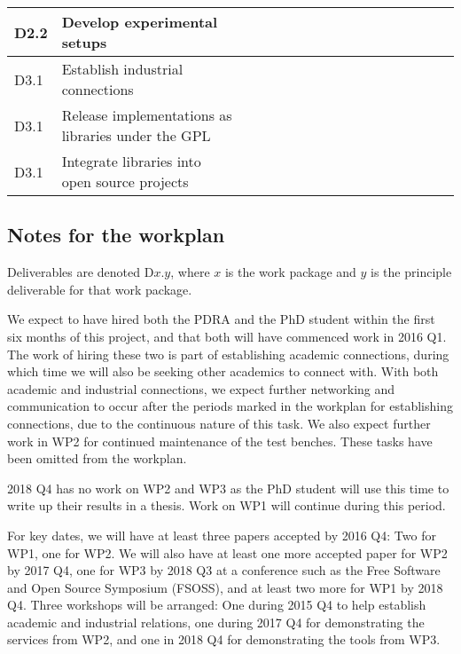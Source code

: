 \documentclass[a4paper,11pt]{article}
\begin{document}
\begin{landscape}
\begin{tabularx}{\linewidth}{|lX|c|c|c|c|c|c|c|c|c|c|c|c|c|c|c|}
        D2.2 & Develop experimental setups & & & & & \cellcolor[gray]{0.5} & \cellcolor[gray]{0.5} & \cellcolor[gray]{0.5} & \cellcolor[gray]{0.5} & \cellcolor[gray]{0.5} & \cellcolor[gray]{0.5} & & & & \\\hline
        D3.1 & Establish industrial connections & \cellcolor[gray]{0.5} & \cellcolor[gray]{0.5} & & & & & \cellcolor[gray]{0.5} & \cellcolor[gray]{0.5} & \cellcolor[gray]{0.5} & & & & & \\\hline
        D3.1 & Release implementations as libraries under the GPL & & & & & & & & & \cellcolor[gray]{0.5} & \cellcolor[gray]{0.5} & \cellcolor[gray]{0.5} & & & \\\hline
        D3.1 & Integrate libraries into open source projects & & & & & & & & & \cellcolor[gray]{0.5} & \cellcolor[gray]{0.5} & \cellcolor[gray]{0.5} & \cellcolor[gray]{0.5} & \cellcolor[gray]{0.5} & \\\hline
    \end{tabularx}

    \subsection*{Notes for the workplan}

    Deliverables are denoted D$x.y$, where $x$ is the work package and $y$ is the principle deliverable for that work package.

    We expect to have hired both the PDRA and the PhD student within the first six months of this project, and that both will have commenced work in 2016 Q1. The work of hiring these two is part of establishing academic connections, during which time we will also be seeking other academics to connect with. With both academic and industrial connections, we expect further networking and communication to occur after the periods marked in the workplan for establishing connections, due to the continuous nature of this task. We also expect further work in WP2 for continued maintenance of the test benches. These tasks have been omitted from the workplan.

    2018 Q4 has no work on WP2 and WP3 as the PhD student will use this time to write up their results in a thesis. Work on WP1 will continue during this period.

    For key dates, we will have at least three papers accepted by 2016 Q4: Two for WP1, one for WP2. We will also have at least one more accepted paper for WP2 by 2017 Q4, one for WP3 by 2018 Q3 at a conference such as the Free Software and Open Source Symposium (FSOSS), and at least two more for WP1 by 2018 Q4. Three workshops will be arranged: One during 2015 Q4 to help establish academic and industrial relations, one during 2017 Q4 for demonstrating the services from WP2, and one in 2018 Q4 for demonstrating the tools from WP3.

    \end{landscape}
\end{document}
